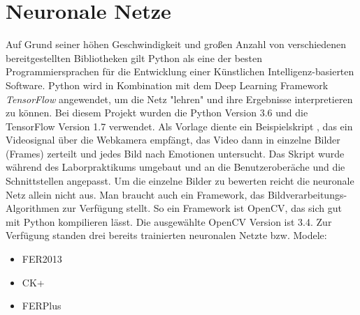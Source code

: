 \documentclass[12pt,a4paper,headinclude,twoside, plainheadsepline, open=right,numbers=noenddot]{scrreprt}
\begin{document}
\section{Neuronale Netze}
Auf Grund seiner höhen Geschwindigkeit und großen Anzahl von verschiedenen
bereitgestellten Bibliotheken gilt Python als eine der besten Programmiersprachen
für die Entwicklung einer Künstlichen Intelligenz-basierten Software.
\newline
Python wird in Kombination mit dem Deep Learning Framework  \textit{TensorFlow} angewendet, um die Netz "lehren" und ihre Ergebnisse interpretieren zu können.
Bei diesem Projekt wurden die Python Version 3.6 und die TensorFlow Version
1.7 verwendet.
 \newline
Als Vorlage diente ein Beispielskript \cite{LeweOhlsenGit}, das ein Videosignal über die Webkamera
empfängt, das Video dann in einzelne Bilder (Frames) zerteilt und jedes Bild
nach Emotionen untersucht. Das Skript wurde während des Laborpraktikums
umgebaut und an die Benutzeroberäche und die Schnittstellen angepasst.\newline
Um die einzelne Bilder zu bewerten reicht die neuronale Netz allein nicht aus. Man
braucht auch ein Framework, das Bildverarbeitungs-Algorithmen zur Verfügung
stellt. So ein Framework ist OpenCV, das sich gut mit Python kompilieren lässt.
Die ausgewählte OpenCV Version ist 3.4.
 \newline
Zur Verfügung standen drei bereits trainierten neuronalen Netzte bzw. Modele: \newline

\begin{itemize}
\item  FER2013 \cite{IasGoodefellow}
\end{itemize}
\begin{itemize}
\item CK+
\end{itemize}
\begin{itemize}
\item FERPlus \newline
\end{itemize}
\end{document}
